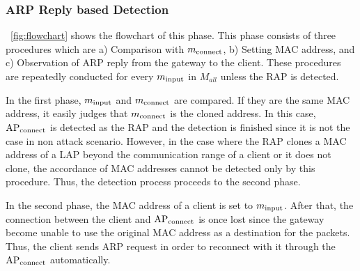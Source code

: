 \documentclass[conference]{IEEEtran}
\newcommand{\tarAP}{\rm AP_{connect}}
\newcommand{\tarMAC}{m_{\rm connect}}
\newcommand{\inputMAC}{m_{\rm input}}
\begin{document}
\subsubsection{ARP Reply based Detection}
\figurename~\ref{fig:flowchart} shows the flowchart of this phase.
This phase consists of three procedures which are a) Comparison with $\tarMAC$, b) Setting MAC address, and c) Observation of ARP reply from the gateway to the client.
These procedures are repeatedly conducted for every $\inputMAC$  in $M_{all}$ unless the RAP is detected.

In the first phase, $\inputMAC$ and $\tarMAC$ are compared.
If they are the same MAC address, it easily judges that $\tarMAC$ is the cloned address.
In this case, $\tarAP$ is detected as the RAP and the detection is finished since it is not the case in non attack scenario.
However, in the case where the RAP clones a MAC address of a LAP beyond the communication range of a client or it does not clone, the accordance of MAC addresses cannot be detected only by this procedure.
Thus, the detection process proceeds to the second phase.

In the second phase, the MAC address of a client is set to $\inputMAC$.
After that, the connection between the client and $\tarAP$ is once lost since the gateway become unable to use the original MAC address as a destination for the packets.
Thus, the client sends ARP request in order to reconnect with it through the $\tarAP$ automatically.
\end{document}
